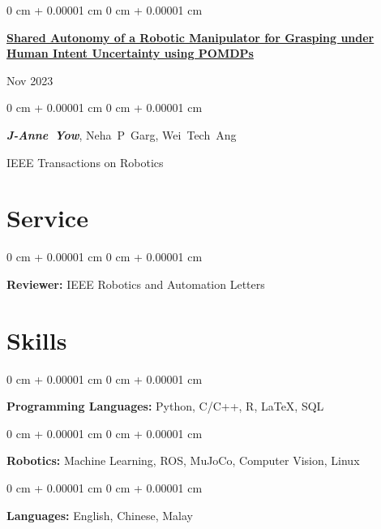 \documentclass[10pt, letterpaper]{article}
\newenvironment{onecolentry}{
    \begin{adjustwidth}{
        0 cm + 0.00001 cm
    }{
        0 cm + 0.00001 cm
    }
}{
    \end{adjustwidth}
} %
\newenvironment{twocolentry}[2][]{
    \onecolentry
    \def\secondColumn{#2}
    \setcolumnwidth{\fill, 4.5 cm}
    \begin{paracol}{2}
}{
    \switchcolumn \raggedleft \secondColumn
    \end{paracol}
    \endonecolentry
} %
\begin{document}
        \vspace{0.2 cm}

        \begin{samepage}
            \begin{twocolentry}{
                Nov 2023
            }
                \textbf{\href{https://ieeexplore.ieee.org/document/10323205}{Shared Autonomy of a Robotic Manipulator for Grasping under Human Intent Uncertainty using POMDPs}}
            \end{twocolentry}

            \vspace{0.10 cm}
            
            \begin{onecolentry}
                \mbox{\textbf{\textit{J-Anne Yow}}}, \mbox{Neha P Garg}, \mbox{Wei Tech Ang}

                \vspace{0.10 cm}
                
        IEEE Transactions on Robotics\end{onecolentry}
        \end{samepage}


    
    \section{Service}



        
        \begin{onecolentry}
            \textbf{Reviewer:} IEEE Robotics and Automation Letters
        \end{onecolentry}


    
    \section{Skills}



        
        \begin{onecolentry}
            \textbf{Programming Languages:} Python, C/C++, R, LaTeX, SQL
        \end{onecolentry}

        \vspace{0.2 cm}

        \begin{onecolentry}
            \textbf{Robotics:} Machine Learning, ROS, MuJoCo, Computer Vision, Linux
        \end{onecolentry}

        \vspace{0.2 cm}

        \begin{onecolentry}
            \textbf{Languages:} English, Chinese, Malay
        \end{onecolentry}


    
\end{document}
